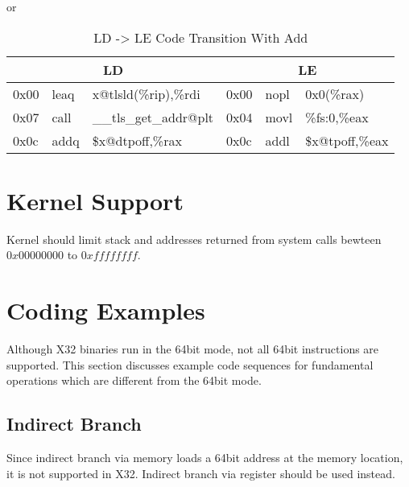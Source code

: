\begin{description}
or

\begin{table}[H]
\Hrule
\caption{LD -> LE Code Transition With Add}
\begin{center}
\code\small{
\begin{tabular}{lll|lll}
\multicolumn{3}{c}{LD} & \multicolumn{3}{c}{LE} \\
\hline
0x00 & leaq  & x@tlsld(\%rip),\%rdi	& 0x00 & nopl & 0x0(\%rax) \\
0x07 & call  & \_\_tls\_get\_addr@plt	& 0x04 & movl & \%fs:0,\%eax\\
0x0c & addq  & \$x@dtpoff,\%rax		& 0x0c & addl & \$x@tpoff,\%eax\\
\end{tabular}
}
\end{center}
\Hrule
\end{table}

\end{description}

\section{Kernel Support}
Kernel should limit stack and addresses returned from system calls
bewteen $0x00000000$ to $0xffffffff$.

\section{Coding Examples}

Although X32 binaries run in the 64bit mode, not all 64bit instructions
are supported. This section discusses example code sequences for
fundamental operations which are different from the 64bit mode.

\subsection{Indirect Branch}

Since indirect branch via memory loads a 64bit address at the memory
location, it is not supported in X32.  Indirect branch via register
should be used instead.


